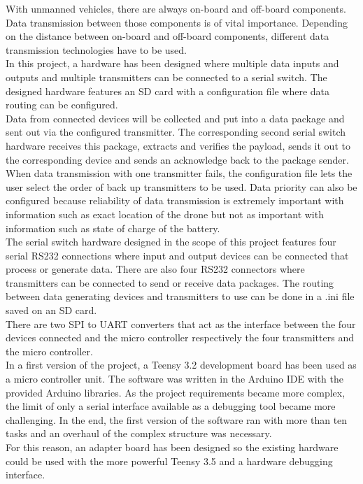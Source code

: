 %
With unmanned vehicles, there are always on-board and off-board components. Data transmission between those components is of vital importance. Depending on the distance between on-board and off-board components, different data transmission technologies have to be used. \\
In this project, a hardware has been designed where multiple data inputs and outputs and multiple transmitters can be connected to a serial switch. The designed hardware features an SD card with a configuration file where data routing can be configured. \\
Data from connected devices will be collected and put into a data package and sent out via the configured transmitter. The corresponding second serial switch hardware receives this package, extracts and verifies the payload, sends it out to the corresponding device and sends an acknowledge back to the package sender. \\
When data transmission with one transmitter fails, the configuration file lets the user select the order of back up transmitters to be used. Data priority can also be configured because reliability of data transmission is extremely important with information such as exact location of the drone but not as important with information such as state of charge of the battery. \\
The serial switch hardware designed in the scope of this project features four serial RS232 connections where input and output devices can be connected that process or generate data. There are also four RS232 connectors where transmitters can be connected to send or receive data packages. The routing between data generating devices and transmitters to use can be done in a .ini file saved on an SD card. \\
There are two SPI to UART converters that act as the interface between the four devices connected and the micro controller respectively the four transmitters and the micro controller. \\
In a first version of the project, a Teensy 3.2 development board has been used as a micro controller unit. The software was written in the Arduino IDE with the provided Arduino libraries. As the project requirements became more complex, the limit of only a serial interface available as a debugging tool became more challenging. In the end, the first version of the software ran with more than ten tasks and an overhaul of the complex structure was necessary.\\
For this reason, an adapter board has been designed so the existing hardware could be used with the more powerful Teensy 3.5 and a hardware debugging interface.\\
